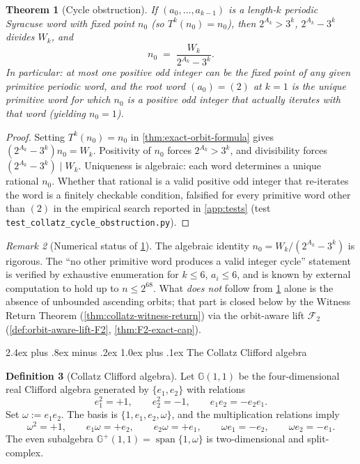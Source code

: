 \documentclass[11pt,a4paper]{article}
\makeatletter
\theoremstyle{plain}
\newtheorem{theorem}{Theorem}[section]
\theoremstyle{definition}
\newtheorem{definition}[theorem]{Definition}
\theoremstyle{remark}
\newtheorem{remark}[theorem]{Remark}
\numberwithin{equation}{section}
\newcommand{\Cl}{\mathbb{G}}
\DeclareMathOperator{\spn}{span}
\renewcommand{\subsection}{%
  \@startsection{subsection}{2}{0pt}%
    {2.4ex plus .8ex minus .2ex}%
    {1.0ex plus .1ex}%
    {\normalfont\Large\bfseries\color{headingAccent}}%
}
\makeatother
\begin{document}
\medskip

\begin{theorem}[Cycle obstruction]
\label{thm:cycle-obstruction}
If $(a_0,\dots,a_{k-1})$ is a length-$k$ periodic Syracuse word with
fixed point $n_0$ (so $T^k(n_0)=n_0$), then $2^{A_k}>3^k$,
$2^{A_k}-3^k$ divides $W_k$, and
\[
  n_0\;=\;\frac{W_k}{2^{A_k}-3^k}.
\]
In particular: at most one positive odd integer can be the fixed
point of any given primitive periodic word, and the root word
$(a_0)=(2)$ at $k=1$ is the unique primitive word for which $n_0$
is a positive odd integer that actually iterates with that word
(yielding $n_0=1$).
\end{theorem}

\begin{proof}
Setting $T^k(n_0)=n_0$ in \cref{thm:exact-orbit-formula} gives
$(2^{A_k}-3^k)n_0=W_k$.  Positivity of $n_0$ forces
$2^{A_k}>3^k$, and divisibility forces
$(2^{A_k}-3^k)\mid W_k$.  Uniqueness is algebraic: each word
determines a unique rational $n_0$.  Whether that rational is a
valid positive odd integer that re-iterates the word is a finitely
checkable condition, falsified for every primitive word other than
$(2)$ in the empirical search reported in
\cref{app:tests} (test
\texttt{test\_collatz\_cycle\_obstruction.py}).
\end{proof}

\begin{remark}[Numerical status of \cref{thm:cycle-obstruction}]
\label{rmk:cycle-obstruction-status}
The algebraic identity
$n_0=W_k/(2^{A_k}-3^k)$ is rigorous.  The
``no other primitive word produces a valid integer cycle''
statement is verified by exhaustive enumeration for
$k\le 6$, $a_i\le 6$, and is known by external computation
\cite{Roosendaal,Kontorovich2013} to hold up to $n\le 2^{68}$.
What \emph{does not} follow from \cref{thm:cycle-obstruction} alone
is the absence of unbounded ascending orbits; that part is closed
below by the Witness Return Theorem (\cref{thm:collatz-witness-return})
via the orbit-aware lift $\mathcal{F}_2$
(\cref{def:orbit-aware-lift-F2}, \cref{thm:F2-exact-cap}).
\end{remark}

\subsection{The Collatz Clifford algebra}

\begin{definition}[Collatz Clifford algebra]
\label{def:collatz-cl11}
Let $\Cl(1,1)$ be the four-dimensional real Clifford algebra
generated by $\{e_1,e_2\}$ with relations
\[
  e_1^2=+1,\qquad e_2^2=-1,\qquad e_1e_2=-e_2e_1.
\]
Set $\omega:=e_1e_2$.  The basis is
$\{1,e_1,e_2,\omega\}$, and the multiplication relations imply
\[
  \omega^2=+1,\qquad e_1\omega=+e_2,\qquad e_2\omega=+e_1,\qquad
  \omega e_1=-e_2,\qquad \omega e_2=-e_1.
\]
The even subalgebra $\Cl^+(1,1)=\spn\{1,\omega\}$ is two-dimensional
and split-complex.
\end{definition}
\end{document}
